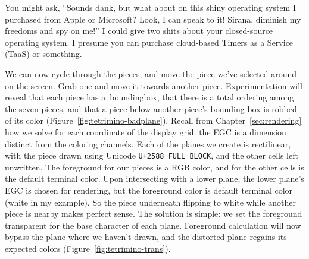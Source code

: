 You might ask, ``Sounds dank, but what about on this shiny operating system I
purchased from Apple or Microsoft? Look, I can speak to it! Sirana, diminish my
freedoms and spy on me!'' I could give two shits about your closed-source
operating system. I presume you can purchase cloud-based Timers as a Service
(TaaS) or something.

We can now cycle through the pieces, and move the piece we've selected around
on the screen. Grab one and move it towards another piece. Experimentation will
reveal that each piece has a~\gls{boundingbox}, that there is a total ordering
among the seven pieces, and that a piece below another piece's bounding box is
robbed of its color (Figure~\ref{fig:tetrimino-badplane}). Recall from
Chapter~\ref{sec:rendering} how we solve for each coordinate of the display
grid: the EGC is a dimension distinct from the coloring channels. Each of the
planes we create is rectilinear, with the piece drawn using Unicode
\texttt{U+2588 FULL BLOCK}, and the other cells left unwritten. The foreground
for our pieces is a RGB color, and for the other cells is the default terminal
color. Upon intersecting with a lower plane, the lower plane's EGC is chosen for
rendering, but the foreground color is default terminal color (white in my
example). So the piece underneath flipping to white while another piece is
nearby makes perfect sense. The solution is simple: we set the foreground
transparent for the base character of each plane. Foreground calculation will
now bypass the plane where we haven't drawn, and the distorted plane regains
its expected colors (Figure~\ref{fig:tetrimino-trans}).

